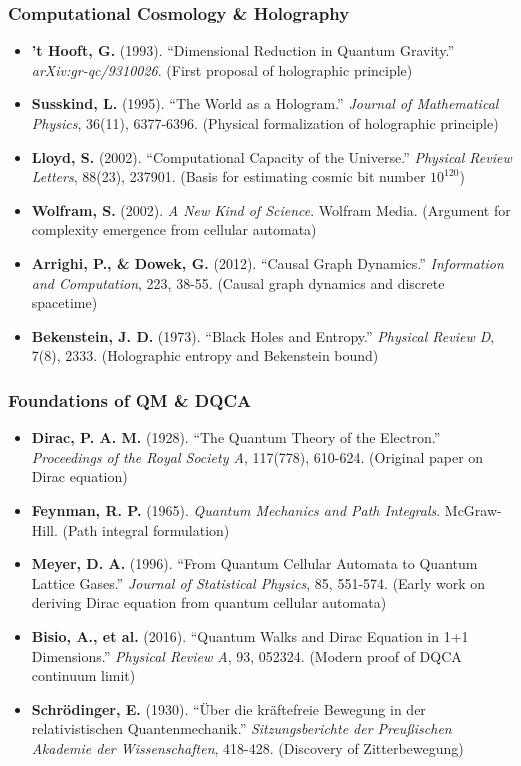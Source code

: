 \subsubsection{Computational Cosmology \& Holography}

\begin{itemize}
\item \textbf{'t Hooft, G.} (1993). ``Dimensional Reduction in Quantum Gravity.'' \textit{arXiv:gr-qc/9310026}. (First proposal of holographic principle)
\item \textbf{Susskind, L.} (1995). ``The World as a Hologram.'' \textit{Journal of Mathematical Physics}, 36(11), 6377-6396. (Physical formalization of holographic principle)
\item \textbf{Lloyd, S.} (2002). ``Computational Capacity of the Universe.'' \textit{Physical Review Letters}, 88(23), 237901. (Basis for estimating cosmic bit number $10^{120}$)
\item \textbf{Wolfram, S.} (2002). \textit{A New Kind of Science}. Wolfram Media. (Argument for complexity emergence from cellular automata)
\item \textbf{Arrighi, P., \& Dowek, G.} (2012). ``Causal Graph Dynamics.'' \textit{Information and Computation}, 223, 38-55. (Causal graph dynamics and discrete spacetime)
\item \textbf{Bekenstein, J. D.} (1973). ``Black Holes and Entropy.'' \textit{Physical Review D}, 7(8), 2333. (Holographic entropy and Bekenstein bound)
\end{itemize}

\subsubsection{Foundations of QM \& DQCA}

\begin{itemize}
\item \textbf{Dirac, P. A. M.} (1928). ``The Quantum Theory of the Electron.'' \textit{Proceedings of the Royal Society A}, 117(778), 610-624. (Original paper on Dirac equation)
\item \textbf{Feynman, R. P.} (1965). \textit{Quantum Mechanics and Path Integrals}. McGraw-Hill. (Path integral formulation)
\item \textbf{Meyer, D. A.} (1996). ``From Quantum Cellular Automata to Quantum Lattice Gases.'' \textit{Journal of Statistical Physics}, 85, 551-574. (Early work on deriving Dirac equation from quantum cellular automata)
\item \textbf{Bisio, A., et al.} (2016). ``Quantum Walks and Dirac Equation in 1+1 Dimensions.'' \textit{Physical Review A}, 93, 052324. (Modern proof of DQCA continuum limit)
\item \textbf{Schr\"{o}dinger, E.} (1930). ``\"{U}ber die kr\"{a}ftefreie Bewegung in der relativistischen Quantenmechanik.'' \textit{Sitzungsberichte der Preu\ss{}ischen Akademie der Wissenschaften}, 418-428. (Discovery of Zitterbewegung)
\end{itemize}

